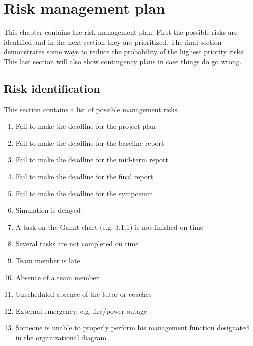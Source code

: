 \section{Risk management plan}
\label{dsePPRiskMP}
This chapter contains the risk management plan. First the possible risks are identified and in the next section they are prioritized. The final section demonstrates some ways to reduce the probability of the highest priority risks. This last section will also show contingency plans in case things do go wrong.
\subsection{Risk identification}
This section contains a list of possible management risks.
\begin{enumerate}
	\item Fail to make the deadline for the project plan
	\item Fail to make the deadline for the baseline report
	\item Fail to make the deadline for the mid-term report
	\item Fail to make the deadline for the final report
	\item Fail to make the deadline for the symposium
	\item Simulation is delayed
	\item A task on the Gannt chart (e.g. 3.1.1) is not finished on time
	\item Several tasks are not completed on time
	\item Team member is late
	\item Absence of a team member
	\item Unscheduled absence of the tutor or coaches
	\item External emergency, e.g. fire/power outage
	\item Someone is unable to properly perform his management function 		  						designated in the organizational diagram.
\end{enumerate}
